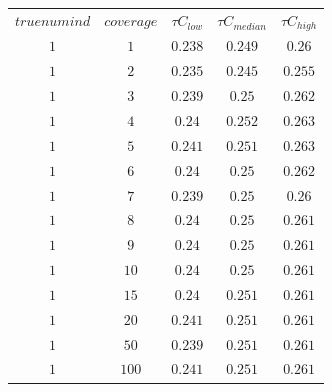 \begin{table}[H]
\begin{tabular}{ccccc}
$truenumind$ & $coverage$ & ${\tau}C_{low}$ & ${\tau}C_{median}$ & ${\tau}C_{high}$\\
$1$ & $1$ & $0.238$ & $0.249$ & $0.26$\\
$1$ & $2$ & $0.235$ & $0.245$ & $0.255$\\
$1$ & $3$ & $0.239$ & $0.25$ & $0.262$\\
$1$ & $4$ & $0.24$ & $0.252$ & $0.263$\\
$1$ & $5$ & $0.241$ & $0.251$ & $0.263$\\
$1$ & $6$ & $0.24$ & $0.25$ & $0.262$\\
$1$ & $7$ & $0.239$ & $0.25$ & $0.26$\\
$1$ & $8$ & $0.24$ & $0.25$ & $0.261$\\
$1$ & $9$ & $0.24$ & $0.25$ & $0.261$\\
$1$ & $10$ & $0.24$ & $0.25$ & $0.261$\\
$1$ & $15$ & $0.24$ & $0.251$ & $0.261$\\
$1$ & $20$ & $0.241$ & $0.251$ & $0.261$\\
$1$ & $50$ & $0.239$ & $0.251$ & $0.261$\\
$1$ & $100$ & $0.241$ & $0.251$ & $0.261$\\
\end{tabular}
\end{table}
 